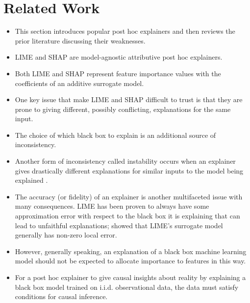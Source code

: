 \documentclass[mnsc,blindrev]{informs3}
\begin{document}
\section{Related Work}
    \label{sec:related_work}
    \begin{itemize}
    
    \item This section introduces popular post hoc explainers and then reviews the prior literature discussing their weaknesses. 
    

     \item LIME and SHAP are model-agnostic attributive post hoc explainers. 
        
    \item Both LIME and SHAP represent feature importance values with the coefficients of an additive surrogate model.
    
    \item One key issue that make LIME and SHAP difficult to trust is that they are prone to giving different, possibly conflicting, explanations for the same input. 
    
    \item The choice of which black box to explain is an additional source of inconsistency.
        
    \item Another form of inconsistency called instability occurs when an explainer gives drastically different explanations for similar inputs to the model being explained \citep{molnar2019}. 
    
    \item The accuracy (or fidelity) of an explainer is another multifaceted issue with many consequences. LIME has been proven to always have some approximation error with respect to the black box it is explaining that can lead to unfaithful explanations; \cite{garreau20theoretical} showed that LIME's surrogate model generally has non-zero local error. 

    \item However, generally speaking, an explanation of a black box machine learning model should not be expected to allocate importance to features in this way. 

    \item For a post hoc explainer to give causal insights about reality by explaining a black box model trained on i.i.d. observational data, the data must satisfy conditions for causal inference.
    \end{itemize}
\end{document}
